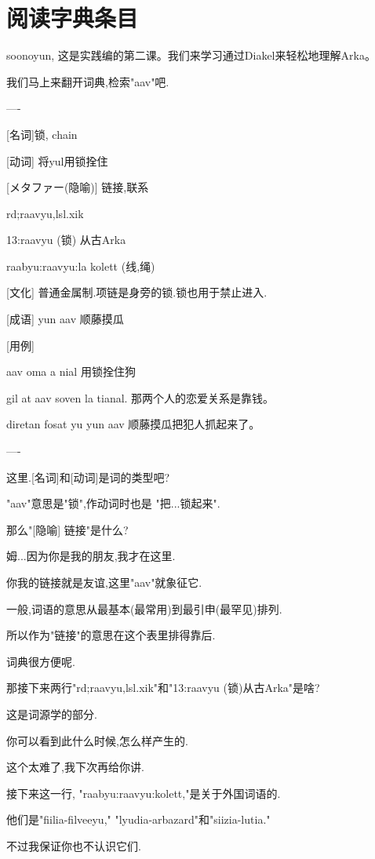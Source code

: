 \chapter{阅读字典条目}
   
soonoyun, 这是实践编的第二课。我们来学习通过Diakel来轻松地理解Arka。

我们马上来翻开词典,检索"aav"吧.

----

[名词]锁, chain 

[动词] 将yul用锁拴住 

[メタファー(隐喻)] 链接,联系

rd;raavyu,lsl.xik 

13:raavyu (锁) 从古Arka 

raabyu:raavyu:la kolett (线,绳) 

[文化] 普通金属制.项链是身旁的锁.锁也用于禁止进入. 

[成语] yun aav 顺藤摸瓜 

[用例]

aav oma a nial 用锁拴住狗

gil at aav soven la tianal. 那两个人的恋爱关系是靠钱。

diretan fosat yu yun aav 顺藤摸瓜把犯人抓起来了。

----


这里.[名词]和[动词]是词的类型吧?

"aav"意思是"锁",作动词时也是 "把...锁起来".

那么"[隐喻] 链接"是什么?


姆...因为你是我的朋友,我才在这里.

你我的链接就是友谊,这里"aav"就象征它.

一般,词语的意思从最基本(最常用)到最引申(最罕见)排列.

所以作为"链接"的意思在这个表里排得靠后.


词典很方便呢.

那接下来两行"rd;raavyu,lsl.xik"和"13:raavyu (锁)从古Arka"是啥?


这是词源学的部分.

你可以看到此什么时候,怎么样产生的.


这个太难了,我下次再给你讲.

接下来这一行, "raabyu:raavyu:kolett,"是关于外国词语的.

他们是"fiilia-filveeyu," "lyudia-arbazard"和"siizia-lutia."


不过我保证你也不认识它们.


